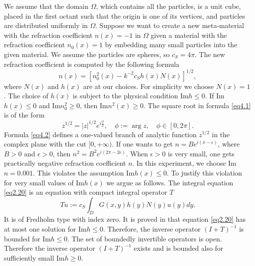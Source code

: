 \documentclass{wap}
\newcommand{\be}{\begin{equation}}
\newcommand{\ee}{\end{equation}}
\begin{document}
We assume that the domain $\Omega$, which contains all the particles, is a unit cube, placed in the first octant such that the origin is one of its vertices, and particles are distributed uniformly in $\Omega$. Suppose we want to create a new meta-material with the refraction coefficient $n(x)=-1$ in $\Omega$  given a material with the refraction coefficient $n_0(x)=1$ by embedding many small particles into the given material. We assume the particles are spheres, so $c_S=4\pi$. The new refraction coefficient is computed by the following formula
\be \label{eq4.1}
	n(x)=[n_0^2(x)-k^{-2}c_Sh(x)N(x)]^{1/2},
\ee
where $N(x)$ and $h(x)$ are at our choices. For simplicity we choose $N(x)=1$. The choice of $h(x)$ is subject to the physical condition
Im$h\le 0$. If Im$h(x) \le 0$ and Im$n_0^2\ge 0$, then Im$n^2(x) \ge 0$.
The square root in formula \eqref{eq4.1} is of the form
\be \label{eq4.2}
	z^{1/2}=|z|^{1/2}e^{i\frac{\phi}{2}}, \quad \phi :=\arg z, \quad \phi \in [0,2\pi].
\ee
Formula \eqref{eq4.2} defines a one-valued branch of analytic function $z^{1/2}$ in the complex plane  with the cut $[0, +\infty)$.
If one wants to get $n=Be^{i(\pi -\epsilon)}$, where $B>0$ and $\epsilon>0$, then $n^2=B^2e^{i(2\pi-2\epsilon)}$.
When $\epsilon >0$ is very small, one gets practically negative refraction coefficient $n$.
In this experiment, we choose Im$n=0.001$. This violates the assumption  Im$h(x) \le 0$. To justify this violation for very small
values of  Im$h(x)$ we argue as follows.
The integral equation \eqref{eq2.20} is an equation with compact integral operator $T$
\be
	Tu:=c_S\int_D G(x,y)h(y)N(y)u(y)dy.
\ee
It is of Fredholm type with index zero. It is proved in \cite{R635} that equation \eqref{eq2.20}
has at most one solution for Im$h\le 0$. Therefore, the inverse operator $(I+T)^{-1}$ is bounded for  Im$h\le 0$.
The set of boundedly invertible operators is open. Therefore   the inverse operator $(I+T)^{-1}$
 exists and is bounded also for sufficiently small Im$h\ge 0$.
\end{document}
